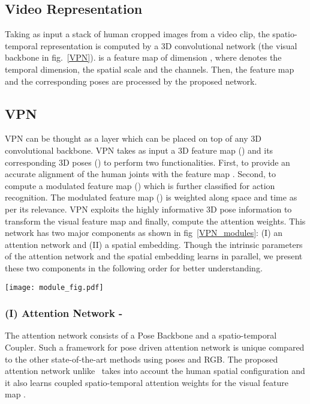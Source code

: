 \documentclass[runningheads]{llncs}
\begin{document}
\subsection{Video Representation}
Taking as input a stack of human cropped images from a video clip, the spatio-temporal representation  is computed by a 3D convolutional network (the visual backbone in fig.~\ref{VPN}).  is a feature map of dimension , where  denotes the temporal dimension,  the spatial scale and  the channels. Then, the feature map  and the corresponding poses  are processed by the proposed network.

\subsection{VPN}
VPN can be thought as a layer which can be placed on top of any 3D convolutional backbone. VPN takes as input a 3D feature map () and its corresponding 3D poses () to perform two functionalities. First, to provide an accurate alignment of the human joints with the feature map . Second, to compute a modulated feature map () which is further classified for action recognition. The modulated feature map () is weighted along space and time as per its relevance. VPN exploits the highly informative 3D pose information to transform the visual feature map  and finally, compute the attention weights. This network has two major components as shown in fig~\ref{VPN_modules}: (I) an attention network and (II) a spatial embedding.
Though the intrinsic parameters of the attention network and the spatial embedding learns in parallel, we present these two components in the following order for better understanding.




\begin{figure*}
\centering
\texttt{[image: module\_fig.pdf]}
\caption{The components in VPN: (I) Attention Network (left) and (II) Spatial Embedding (right). We present a zoom of the attention Network with: (A) a GCN Pose Backbone, and (B) a spatio-temporal Coupler to generate spatio-temporal attention weights  }\vspace{-1em}
\label{VPN_modules}
\end{figure*}

\subsubsection{(I) Attention Network -}
The attention network consists of a Pose Backbone and a spatio-temporal Coupler. Such a framework for pose driven attention network is unique compared to the other state-of-the-art methods using poses and RGB. The proposed attention network unlike~\cite{Baradel_BMVC,glimpse,spatial-i3d,STA_iccv} takes into account the human spatial configuration and it also learns coupled spatio-temporal attention weights for the visual feature map . 
\end{document}
